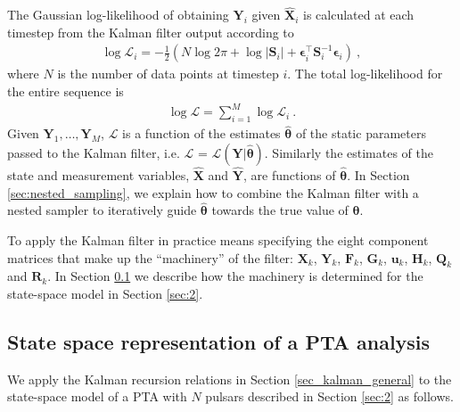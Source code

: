 \documentclass[fleqn,usenatbib,useAMS]{mnras}
\begin{document}
The Gaussian log-likelihood of obtaining ${\boldsymbol{Y}}_i$ given ${\boldsymbol{\hat X}}_i$ is calculated at each timestep from the Kalman filter output according to
\begin{eqnarray}
	\log \mathcal{L}_i =  -\frac{1}{2} \left (N \log 2 \pi + \log  \left | \boldsymbol{S}_i \right | + \boldsymbol{\epsilon}_i^{\intercal} \boldsymbol{S}_i^{-1}  \boldsymbol{\epsilon}_i \right ) \ ,
\end{eqnarray}
where $N$ is the number of data points at timestep $i$. The total log-likelihood for the entire sequence is
\begin{eqnarray}
	\log \mathcal{L} =  \sum_{i=1}^{M} \log \mathcal{L}_i \ . \label{eq:likelihood}
\end{eqnarray}
Given ${\boldsymbol{Y}}_1, \dots, {\boldsymbol{Y}}_M$, $\mathcal{L}$ is a function of the estimates ${\boldsymbol{\hat \theta}}$ of the static parameters passed to the Kalman filter, i.e. $\mathcal{L}$ = $\mathcal{L}(\boldsymbol{Y} | \boldsymbol{\hat \theta})$. Similarly the estimates of the state and measurement variables, $\hat{\boldsymbol{X}}$ and $\hat{\boldsymbol{Y}}$, are functions of $\boldsymbol{\hat \theta}$. In Section \ref{sec:nested_sampling}, we explain how to combine the Kalman filter with a nested sampler to iteratively guide ${\boldsymbol{\hat \theta}}$ towards the true value of ${\boldsymbol{\theta}}$. \newline 

To apply the Kalman filter in practice means specifying the eight component matrices that make up the ``machinery'' of the filter: $\boldsymbol{X}_k$, $\boldsymbol{Y}_k$, $\boldsymbol{F}_k$, $\boldsymbol{G}_k$, $\boldsymbol{u}_k$, $\boldsymbol{H}_k$, $\boldsymbol{Q}_k$ and $\boldsymbol{R}_k$. In Section \ref{sec_kalman_specific} we describe how the machinery is determined for the state-space model in Section \ref{sec:2}. 


\subsection{State space representation of a PTA analysis}\label{sec_kalman_specific}
We apply the Kalman recursion relations in Section \ref{sec_kalman_general} to the state-space model of a PTA with $N$ pulsars described in Section \ref{sec:2} as follows. \newline 
\end{document}
